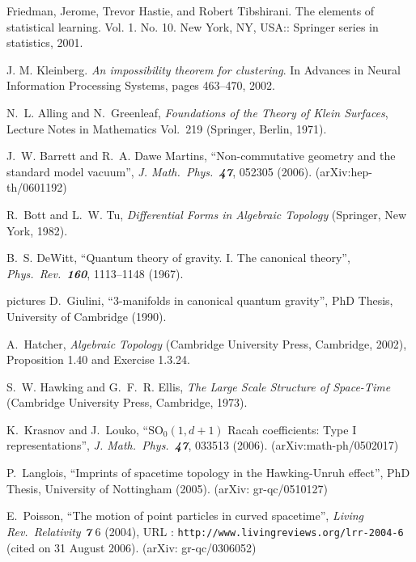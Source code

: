 \documentclass{uonmathreport}
\begin{document}
\begin{thebibliography}{99} %


Friedman, Jerome, Trevor Hastie, and Robert Tibshirani. The elements of statistical learning. Vol. 1. No. 10. New York, NY, USA:: Springer series in statistics, 2001.



  J. M. Kleinberg.
 \emph{An impossibility theorem for clustering}.
 In Advances in Neural Information Processing Systems, pages 463–470, 2002. 

N.~L. Alling and N.~Greenleaf,
{\it Foundations of the Theory of Klein Surfaces\/},
Lecture Notes in Mathematics Vol.~219
(Springer, Berlin, 1971).

J.~W. Barrett and R.~A. Dawe Martins,
``Non-commutative geometry and the standard model vacuum'',
{\it J. Math.\ Phys.\ \bf 47}, 052305 (2006).
(arXiv:hep-th/0601192)

R.~Bott and L.~W. Tu,
{\it Differential Forms in Algebraic Topology\/}
(Springer, New York, 1982).

B.~S. DeWitt,
``Quantum theory of gravity. I. The canonical theory'',
{\it Phys.\ Rev.\ \bf 160}, 1113--1148
(1967).

 pictures
D.~Giulini,
``3-manifolds in canonical quantum gravity'',
PhD Thesis,
University of Cambridge (1990).

A.~Hatcher,
{\it Algebraic Topology\/}
(Cambridge University Press, Cambridge, 2002),
Proposition 1.40 and Exercise 1.3.24.

S.~W. Hawking and G.~F.~R. Ellis,
{\it The Large Scale Structure of Space-Time\/}
(Cambridge University Press, Cambridge, 1973).

K.~Krasnov and J.~Louko,
``$\mathrm{SO}_0(1,d+1)$ Racah coefficients: Type I representations'',
{\it J. Math.\ Phys.\ \bf 47}, 033513 (2006).
(arXiv:math-ph/0502017)

P.~Langlois,
``Imprints of spacetime topology in the Hawking-Unruh effect'',
PhD Thesis, University of Nottingham (2005).
(arXiv: gr-qc/0510127)

E.~Poisson,
``The motion of point particles in curved spacetime'',
{\it Living Rev.\ Relativity \bf 7} 6 (2004),
URL : \texttt{http://www.livingreviews.org/lrr-2004-6} (cited on 31 August 2006).
(arXiv: gr-qc/0306052)


\end{thebibliography}
\end{document}

